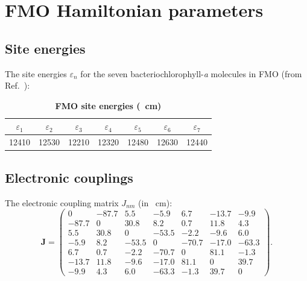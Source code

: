 \documentclass[11pt,a4paper]{article}
\begin{document}

\section{FMO Hamiltonian parameters}
\label{sec:S2}

\subsection{Site energies}

The site energies $\varepsilon_n$ for the seven bacteriochlorophyll-\textit{a} molecules in FMO (from Ref.\ \cite{Adolphs2006}):

\begin{table}[htb]
\centering
\caption{\textbf{FMO site energies (\si{\per\centi\meter})}}
\label{tab:SI_site_energies}
\begin{tabular}{ccccccc}
\toprule
$\varepsilon_1$ & $\varepsilon_2$ & $\varepsilon_3$ & $\varepsilon_4$ & $\varepsilon_5$ & $\varepsilon_6$ & $\varepsilon_7$ \\
\midrule
12410 & 12530 & 12210 & 12320 & 12480 & 12630 & 12440 \\
\bottomrule
\end{tabular}
\end{table}

\subsection{Electronic couplings}

The electronic coupling matrix $J_{nm}$ (in \si{\per\centi\meter}):
\begin{equation}
\mathbf{J} = \begin{pmatrix}
0 & -87.7 & 5.5 & -5.9 & 6.7 & -13.7 & -9.9 \\
-87.7 & 0 & 30.8 & 8.2 & 0.7 & 11.8 & 4.3 \\
5.5 & 30.8 & 0 & -53.5 & -2.2 & -9.6 & 6.0 \\
-5.9 & 8.2 & -53.5 & 0 & -70.7 & -17.0 & -63.3 \\
6.7 & 0.7 & -2.2 & -70.7 & 0 & 81.1 & -1.3 \\
-13.7 & 11.8 & -9.6 & -17.0 & 81.1 & 0 & 39.7 \\
-9.9 & 4.3 & 6.0 & -63.3 & -1.3 & 39.7 & 0
\end{pmatrix}.
\label{eq:SI_coupling_matrix}
\end{equation}
\end{document}
